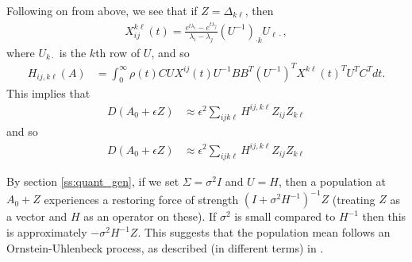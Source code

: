 \documentclass[9 pt]{article}
\newcommand{\1}{\mathbbm{1}}
\begin{document}
Following on from above, we see that if $Z=\Delta_{k \ell}$, then
\begin{equation}
  \begin{aligned}
      X_{ij}^{k\ell}(t) = 
      \frac{ e^{t \lambda_i} - e^{t \lambda_j} }{ \lambda_i - \lambda_j } 
      (U^{-1})_{\cdot k} U_{\ell \cdot},
  \end{aligned}
\end{equation}
where $U_{k \cdot}$ is the $k$th row of $U$,
and so
\begin{equation}
    \begin{aligned}
        H_{ij, k\ell}(A)
        &=
        \int_0^\infty
            \rho(t) C U X^{ij}(t) U^{-1} B B^T (U^{-1})^T X^{k\ell}(t)^T U^T C^T
        dt .
    \end{aligned}
\end{equation}
This implies that
\begin{equation}
    \begin{aligned}
        D(A_0+\epsilon Z)
        &\approx \epsilon^2\sum_{ijk\ell} H^{ij,k\ell} Z_{ij} Z_{k\ell} 
    \end{aligned}
\end{equation}
and so
\begin{equation}
    \begin{aligned}
        D(A_0+\epsilon Z)
        &\approx \epsilon^2\sum_{ijk\ell} H^{ij,k\ell} Z_{ij} Z_{k\ell} 
    \end{aligned}
\end{equation}

By section \ref{ss:quant_gen},
if we set $\Sigma=\sigma^2 I$ and $U=H$,
then a population at $A_0+Z$ experiences a restoring force of strength
$(I + \sigma^2 H^{-1})^{-1} Z$ (treating $Z$ as a vector and $H$ as an operator on these).
If $\sigma^2$ is small compared to $H^{-1}$
then this is approximately $-\sigma^2 H^{-1} Z$.
This suggests that the population mean follows an Ornstein-Uhlenbeck process,
as described (in different terms) in \citet{hansen1996translating}.
\end{document}
